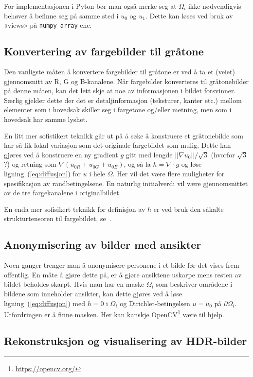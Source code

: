 \documentclass[11pt,a4paper]{article}
\begin{document}
For implementasjonen i Pyton bør man også merke seg at $\Omega_i$ ikke nødvendigvis behøver å befinne seg på samme sted i $u_0$ og $u_1$. Dette kan løses ved bruk av «views» på \texttt{numpy array}-ene.

\subsection{Konvertering av fargebilder til gråtone}

Den vanligste måten å konvertere fargebilder til gråtone er ved å ta et (veiet) gjennomsnitt av R, G og B-kanalene. Når fargebilder konverteres til gråtonebilder på denne måten, kan det lett skje at noe av informasjonen i bildet forsvinner. Særlig gjelder dette der det er detaljinformasjon (teksturer, kanter etc.) mellom elementer som i hovedsak skiller seg i fargetone og/eller metning, men som i hovedsak har samme lyshet.

En litt mer sofistikert teknikk går ut på å søke å konstruere et gråtonebilde som har så lik lokal variasjon som det originale fargebildet som mulig. Dette kan gjøres ved å konstruere en ny gradient $g$ gitt med lengde $||\nabla u_0||/\sqrt{3}$ (hvorfor $\sqrt{3}$?) og retning som $\nabla(u_{0R} + u_{0G} + u_{0B})$, og så la $h = \nabla\cdot g$ og løse ligning~(\ref{eq:diffusjon}) for $u$ i hele $\Omega$. Her vil det være flere muligheter for spesifikasjon av randbetingelsene. En naturlig initialverdi vil være gjennomsnittet av de tre fargekanalene i originalbildet.

En enda mer sofisikert teknikk for definisjon av $h$ er ved bruk den såkalte strukturtensoren til fargebildet, se~\cite{Alsam:08}.

\subsection{Anonymisering av bilder med ansikter}

Noen ganger trenger man å anonymisere personene i et bilde før det vises frem offentlig. En måte å gjøre dette på, er å gjøre ansiktene uskarpe mens resten av bildet beholdes skarpt. Hvis man har en maske $\Omega_i$ som beskriver områdene i bildene som inneholder ansikter, kan dette gjøres ved å løse ligning~(\ref{eq:diffusjon}) med $h=0$ i $\Omega_i$ og Dirichlet-betingelsen $u = u_0$ på $\partial\Omega_i$. Utfordringen er å finne masken. Her kan kanskje OpenCV\footnote{\url{https://opencv.org/}} være til hjelp.

\subsection{Rekonstruksjon og visualisering av HDR-bilder}
\end{document}
